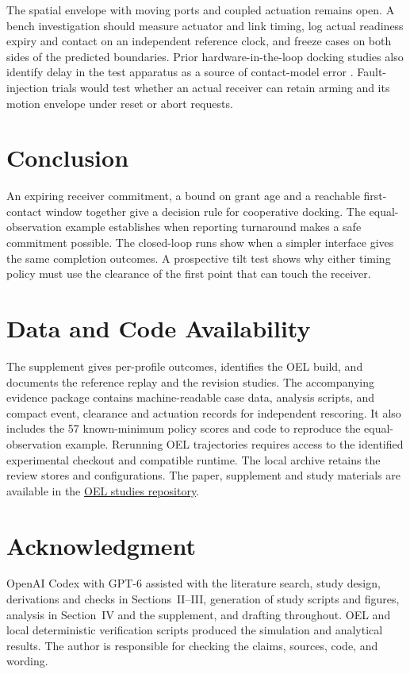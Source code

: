 \documentclass{IEEEtaes}
\begin{document}
The spatial envelope with moving ports and coupled actuation remains open. A bench investigation should measure actuator and link timing, log actual readiness expiry and contact on an independent reference clock, and freeze cases on both sides of the predicted boundaries. Prior hardware-in-the-loop docking studies also identify delay in the test apparatus as a source of contact-model error \cite{zebenay}. Fault-injection trials would test whether an actual receiver can retain arming and its motion envelope under reset or abort requests.

\section{Conclusion}

An expiring receiver commitment, a bound on grant age and a reachable first-contact window together give a decision rule for cooperative docking. The equal-observation example establishes when reporting turnaround makes a safe commitment possible. The closed-loop runs show when a simpler interface gives the same completion outcomes. A prospective tilt test shows why either timing policy must use the clearance of the first point that can touch the receiver.

\section*{Data and Code Availability}

The supplement gives per-profile outcomes, identifies the OEL build, and documents the reference replay and the revision studies. The accompanying evidence package contains machine-readable case data, analysis scripts, and compact event, clearance and actuation records for independent rescoring. It also includes the 57 known-minimum policy scores and code to reproduce the equal-observation example. Rerunning OEL trajectories requires access to the identified experimental checkout and compatible runtime. The local archive retains the review stores and configurations. The paper, supplement and study materials are available in the \href{https://github.com/adamcohen8/OEL-studies/tree/main/original-research/cooperative-docking}{OEL studies repository}.

\section*{Acknowledgment}

OpenAI Codex with GPT-6 assisted with the literature search, study design, derivations and checks in Sections~II--III, generation of study scripts and figures, analysis in Section~IV and the supplement, and drafting throughout. OEL and local deterministic verification scripts produced the simulation and analytical results. The author is responsible for checking the claims, sources, code, and wording.

\newpage


\end{document}
